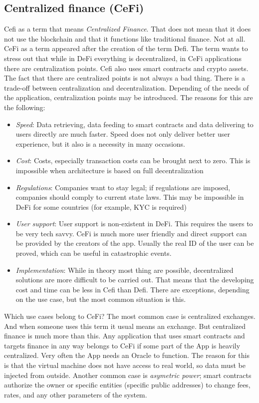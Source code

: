 \documentclass{article}
\begin{document}
\subsection{Centralized finance (CeFi)}
Cefi as a term that means \emph{Centralized Finance}. That does not mean that it does not use the blockchain and that it functions like traditional finance. Not at all. CeFi as a term appeared after the creation of the term Defi. The term wants to stress out that while in DeFi everything is decentralized, in CeFi applications there are centralization points. Cefi also uses smart contracts and crypto assets. The fact that there are centralized points is not always a bad thing. There is a trade-off between centralization and decentralization. Depending of the needs of the application, centralization points may be introduced. The reasons for this are the following:
\begin{itemize}
\item \emph{Speed}: Data retrieving, data feeding to smart contracts and data delivering to users directly are much faster. Speed does not only deliver better user experience, but it also is a necessity in many occasions.
\item \emph{Cost}: Costs, especially transaction costs can be brought next to zero. This is impossible when architecture is based on full decentralization
\item \emph{Regulations}: Companies want to stay legal; if regulations are imposed, companies should comply to current state laws. This may be impossible in DeFi for some countries (for example, KYC is required)
\item \emph{User support}: User support is non-existent in DeFi. This requires the users to be very tech savvy. CeFi is much more user friendly and direct support can be provided by the creators of the app. Usually the real ID of the user can be proved, which can be useful in catastrophic events.
\item \emph{Implementation}: While in theory most thing are possible, decentralized solutions are more difficult to be carried out. That means that the developing cost and time can be less in Cefi than Defi. There are exceptions, depending on the use case, but the most common situation is this.
\end{itemize}
Which use cases belong to CeFi? The most common case is centralized exchanges. And when someone uses this term it usual means an exchange. But centralized finance is much more than this. Any application that uses smart contracts and targets finance in any way belongs to CeFi if some part of the App is heavily centralized. Very often the App needs an Oracle to function. The reason for this is that the virtual machine does not have access to real world, so data must be injected from outside. Another common case is \emph{asymetric power}; smart contracts authorize the owner or specific entities (specific public addresses) to change fees, rates, and any other parameters of the system.
\end{document}
